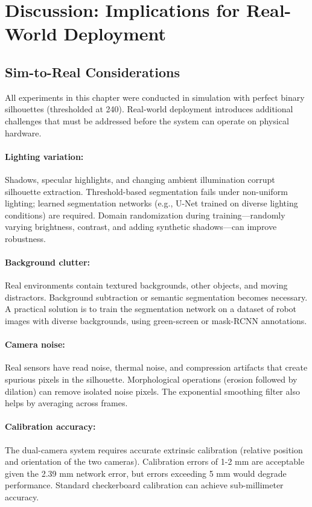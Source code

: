 \documentclass[12pt,a4paper,oneside]{report}
\begin{document}
\section{Discussion: Implications for Real-World Deployment}

\subsection{Sim-to-Real Considerations}

All experiments in this chapter were conducted in simulation with perfect binary silhouettes (thresholded at 240). Real-world deployment introduces additional challenges that must be addressed before the system can operate on physical hardware.

\paragraph{Lighting variation:} Shadows, specular highlights, and changing ambient illumination corrupt silhouette extraction. Threshold-based segmentation fails under non-uniform lighting; learned segmentation networks (e.g., U-Net trained on diverse lighting conditions) are required. Domain randomization during training---randomly varying brightness, contrast, and adding synthetic shadows---can improve robustness.

\paragraph{Background clutter:} Real environments contain textured backgrounds, other objects, and moving distractors. Background subtraction or semantic segmentation becomes necessary. A practical solution is to train the segmentation network on a dataset of robot images with diverse backgrounds, using green-screen or mask-RCNN annotations.

\paragraph{Camera noise:} Real sensors have read noise, thermal noise, and compression artifacts that create spurious pixels in the silhouette. Morphological operations (erosion followed by dilation) can remove isolated noise pixels. The exponential smoothing filter also helps by averaging across frames.

\paragraph{Calibration accuracy:} The dual-camera system requires accurate extrinsic calibration (relative position and orientation of the two cameras). Calibration errors of 1-2 mm are acceptable given the 2.39 mm network error, but errors exceeding 5 mm would degrade performance. Standard checkerboard calibration can achieve sub-millimeter accuracy.
\end{document}
